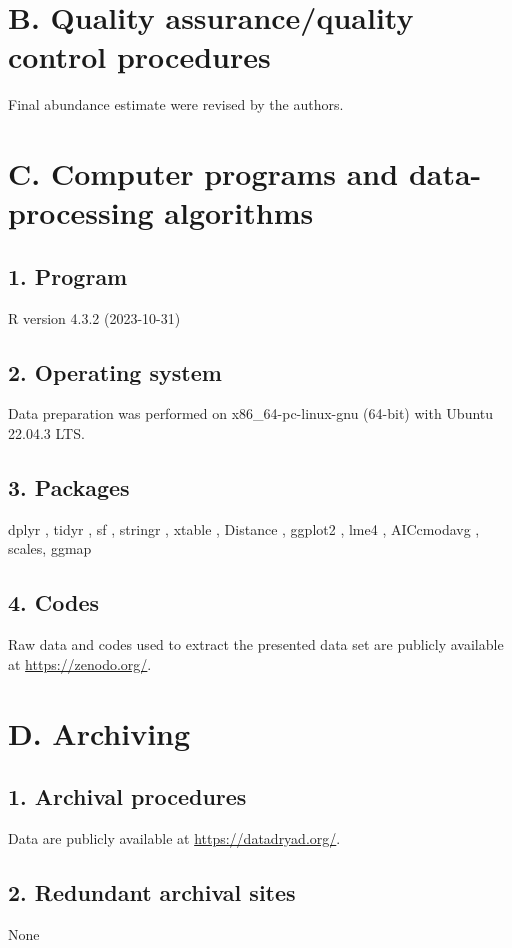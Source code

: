 \documentclass[a4paper,twoside,12pt]{article}
\begin{document}
    \section*{B. Quality assurance/quality control procedures}
    Final abundance estimate were revised by the authors.

    \section*{C. Computer programs and data-processing algorithms}
         \subsection*{1. Program} R version 4.3.2 (2023-10-31)
         \subsection*{2. Operating system} Data preparation was performed on x86\_64-pc-linux-gnu (64-bit) with Ubuntu 22.04.3 LTS.
         \subsection*{3. Packages} dplyr \citep{dplyr}, tidyr \citep{tidyr}, sf \citep{sf}, stringr \citep{stringr}, xtable \citep{xtable}, Distance \citep{miller2019}, ggplot2 \citep{ggplot2}, lme4 \citep{lme4}, AICcmodavg \citep{AICcmodavg}, scales\citep{scales}, ggmap \citep{ggmap}
         \subsection*{4. Codes} Raw data and codes used to extract the presented data set are publicly available at \url{https://zenodo.org/}.
                
    \section*{D. Archiving}
         \subsection*{1. Archival procedures} Data are publicly available at \url{https://datadryad.org/}.
         \subsection*{2. Redundant archival sites} None
            
       
\end{document}
